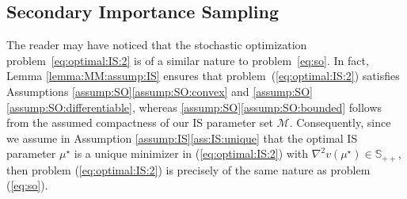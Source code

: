 \documentclass[11pt,a4paper]{article}
\theoremstyle{definition}
\newcommand{\mc}{\mathcal}
\newcommand{\mb}{\mathbb}
\begin{document}



\subsection{Secondary Importance Sampling}
\label{subsec:secondary:IS}

The reader may have noticed that the stochastic optimization problem~\eqref{eq:optimal:IS:2} is of a similar nature to problem~\eqref{eq:so}. In fact, Lemma \ref{lemma:MM:assump:IS} ensures that problem~(\ref{eq:optimal:IS:2}) satisfies Assumptions \ref{assump:SO}\ref{assump:SO:convex} and \ref{assump:SO}\ref{assump:SO:differentiable}, whereas \ref{assump:SO}\ref{assump:SO:bounded} follows from the assumed compactness of our IS parameter set $\mc M$.
Consequently, since we assume in Assumption \ref{assump:IS}\ref{ass:IS:unique} that the optimal IS parameter $\mu^\star$ is a unique minimizer in (\ref{eq:optimal:IS:2}) with $\nabla^2 v(\mu^\star)\in \mb S_{++}$, then problem (\ref{eq:optimal:IS:2}) is precisely of the same nature as problem (\ref{eq:so}).
\end{document}
